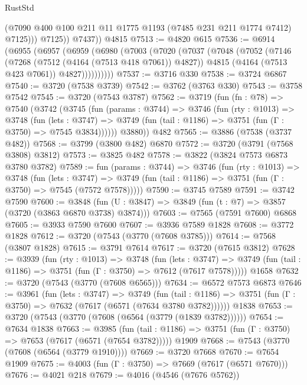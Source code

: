 \begin{lexlean}{RustStd}
\begin{coremodule}
                (@7090 @400 @100 @211 @11 @1775 @1193 (@7485 @231 @211 @1774 @7412) @7125)))
            @7125))
        @7437))
    @4815
@7513 := @4820 @615
@7536 := @6914
    (@6955
      (@6957
        (@6959
          (@6980
            (@7003
              (@7020
                (@7037
                  (@7048
                    (@7052
                      (@7146
                        (@7268 (@7512 (@4164 (@7513 @418 @7061)) @4827))
                        @4815
                        (@4164 (@7513 @423 @7061))
                        @4827))))))))))
@7537 := @3716 @330
@7538 := @3724 @6867
@7540 := @3720 (@7538 @3739)
@7542 := @3762 (@3763 @330)
@7543 := @3758 @7542
@7545 := @3720 (@7543 @3787)
@7562 := @3719
    (fun (fn : @78) =>
    @7540
      (@3742
        (@3745
          (fun (params : @3744) =>
          @3746
            (fun (rty : @1013) =>
            @3748
              (fun (lets : @3747) =>
              @3749 (fun (tail : @1186) => @3751 (fun (Γ : @3750) => @7545 @3834))))))
        @3880))
    @482
@7565 := @3886 (@7538 (@3737 @482))
@7568 := @3799 (@3800 @482) @6870
@7572 := @3720 (@3791 (@7568 @3808) @3812)
@7573 := @3825 @482
@7578 := @3822 (@3824 @7573 @6873 @3780 @3782)
@7589 := fun (params : @3744) =>
  @3746
    (fun (rty : @1013) =>
    @3748
      (fun (lets : @3747) =>
      @3749 (fun (tail : @1186) => @3751 (fun (Γ : @3750) => @7545 (@7572 @7578)))))
@7590 := @3745 @7589
@7591 := @3742 @7590
@7600 := @3848 (fun (U : @3847) => @3849 (fun (t : @7) => @3857 (@3720 (@3863 @6870 @3738) @3874)))
@7603 := @7565 (@7591 @7600) @6868
@7605 := @3933 @7590 @7600
@7607 := @3936 @7589 @1828
@7608 := @3772 @1828
@7612 := @3720 (@7543 (@3770 (@7608 @3785)))
@7614 := @7568 (@3807 @1828)
@7615 := @3791 @7614
@7617 := @3720 (@7615 @3812)
@7628 := @3939
    (fun (rty : @1013) =>
    @3748
      (fun (lets : @3747) =>
      @3749 (fun (tail : @1186) => @3751 (fun (Γ : @3750) => @7612 (@7617 @7578)))))
    @1658
@7632 := @3720 (@7543 (@3770 (@7608 @6565)))
@7634 := @6572 @7573 @6873
@7646 := @3961
    (fun (lets : @3747) =>
    @3749
      (fun (tail : @1186) => @3751 (fun (Γ : @3750) => @7632 (@7617 (@6571 (@7634 @3780 @3782))))))
    @1838
@7653 := @3720 (@7543 (@3770 (@7608 (@6564 (@3779 (@1839 @3782))))))
@7654 := @7634 @1838
@7663 := @3985
    (fun (tail : @1186) => @3751 (fun (Γ : @3750) => @7653 (@7617 (@6571 (@7654 @3782)))))
    @1909
@7668 := @7543 (@3770 (@7608 (@6564 (@3779 @1910))))
@7669 := @3720 @7668
@7670 := @7654 @1909
@7675 := @4003 (fun (Γ : @3750) => @7669 (@7617 (@6571 @7670)))
@7676 := @4021 @218
@7679 := @4016 (@4546 (@7676 @5762))

\end{coremodule}
\end{lexlean}
